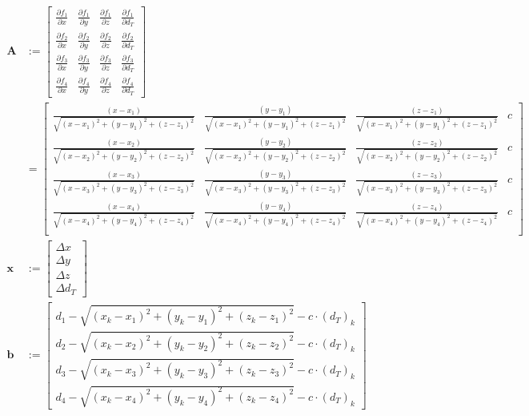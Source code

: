 \documentclass[a4paper,twoside,12pt]{memoir} %
\begin{document}
\begin{align}
\mathbf{A} & := \begin{bmatrix}
\frac{\partial f_1}{\partial x} &
\frac{\partial f_1}{\partial y} &
\frac{\partial f_1}{\partial z} &
\frac{\partial f_1}{\partial d_T} \\
\frac{\partial f_2}{\partial x} &
\frac{\partial f_2}{\partial y} &
\frac{\partial f_2}{\partial z} &
\frac{\partial f_2}{\partial d_T} \\
\frac{\partial f_3}{\partial x} &
\frac{\partial f_3}{\partial y} &
\frac{\partial f_3}{\partial z} &
\frac{\partial f_3}{\partial d_T} \\
\frac{\partial f_4}{\partial x} &
\frac{\partial f_4}{\partial y} &
\frac{\partial f_4}{\partial z} &
\frac{\partial f_4}{\partial d_T}
\end{bmatrix} \\
& = \begin{bmatrix}
\frac{(x-x_1)}{\sqrt{(x-x_1)^{2}+(y-y_1)^{2}+(z-z_1)^{2}}} & \frac{(y-y_1)}{\sqrt{(x-x_1)^{2}+(y-y_1)^{2}+(z-z_1)^{2}}} & \frac{(z-z_1)}{\sqrt{(x-x_1)^{2}+(y-y_1)^{2}+(z-z_1)^{2}}} & c \\
\frac{(x-x_2)}{\sqrt{(x-x_2)^{2}+(y-y_2)^{2}+(z-z_2)^{2}}} & \frac{(y-y_2)}{\sqrt{(x-x_2)^{2}+(y-y_2)^{2}+(z-z_2)^{2}}} & \frac{(z-z_2)}{\sqrt{(x-x_2)^{2}+(y-y_2)^{2}+(z-z_2)^{2}}} & c \\
\frac{(x-x_3)}{\sqrt{(x-x_3)^{2}+(y-y_3)^{2}+(z-z_3)^{2}}} & \frac{(y-y_3)}{\sqrt{(x-x_3)^{2}+(y-y_3)^{2}+(z-z_3)^{2}}} & \frac{(z-z_3)}{\sqrt{(x-x_3)^{2}+(y-y_3)^{2}+(z-z_3)^{2}}} & c \\
\frac{(x-x_4)}{\sqrt{(x-x_4)^{2}+(y-y_4)^{2}+(z-z_4)^{2}}} & \frac{(y-y_4)}{\sqrt{(x-x_4)^{2}+(y-y_4)^{2}+(z-z_4)^{2}}} & \frac{(z-z_4)}{\sqrt{(x-x_4)^{2}+(y-y_4)^{2}+(z-z_4)^{2}}} & c \\
\end{bmatrix}\\
\mathbf{x} & :=  \begin{bmatrix}
\Delta x \\
\Delta y \\
\Delta z \\
\Delta d_T
\end{bmatrix}\\
\mathbf{b} & := \begin{bmatrix}
d_1 - \sqrt{(x_k-x_1)^{2}+(y_k-y_1)^{2}+(z_k-z_1)^{2}} - c\cdot (d_T)_k \\
d_2 - \sqrt{(x_k-x_2)^{2}+(y_k-y_2)^{2}+(z_k-z_2)^{2}} - c\cdot (d_T)_k \\
d_3 - \sqrt{(x_k-x_3)^{2}+(y_k-y_3)^{2}+(z_k-z_3)^{2}} - c\cdot (d_T)_k \\
d_4 - \sqrt{(x_k-x_4)^{2}+(y_k-y_4)^{2}+(z_k-z_4)^{2}} - c\cdot (d_T)_k
\end{bmatrix}
\end{align}
\end{document}
